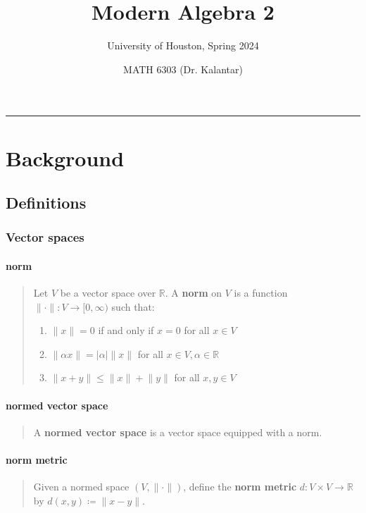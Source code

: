 \documentclass[letterpaper, 10pt]{article}
\title{Modern Algebra 2}
\author{University of Houston, Spring 2024}
\date{MATH 6303 (Dr. Kalantar)}
\theoremstyle{theostyle}
\begin{document}
\maketitle
\rule{0.9\textwidth}{0.5pt}

\tableofcontents
\newpage

\section{Background}

\subsection{Definitions}

\subsubsection{Vector spaces}

\paragraph{norm}
\begin{quote}
    Let \(V\) be a vector space over \(\mathbb{R}\).
    A \textbf{norm} on \(V\) is a function \(\lVert \cdot \rVert : V \rightarrow [0, \infty)\) such that:
    \begin{enumerate}
        \item \(\lVert x \rVert = 0\) if and only if \(x = 0\) for all \(x \in V\)
        \item \(\lVert \alpha x \rVert = \lvert \alpha \rvert \lVert x \rVert\) for all \(x \in V, \alpha \in \mathbb{R}\)
        \item \(\lVert x + y \rVert \leq \lVert x \rVert + \lVert y \rVert\) for all \(x, y \in V\)
    \end{enumerate}
\end{quote}

\paragraph{normed vector space}
\begin{quote}
    A \textbf{normed vector space} is a vector space equipped with a norm.
\end{quote}

\paragraph{norm metric}
\begin{quote}
    Given a normed space \(\left(V, \lVert \cdot \rVert\right)\), define the \textbf{norm metric} \(d:V\times V \rightarrow \mathbb{R}\) by \(d(x,y) \coloneqq \lVert x - y \rVert\).
\end{quote}
\end{document}
